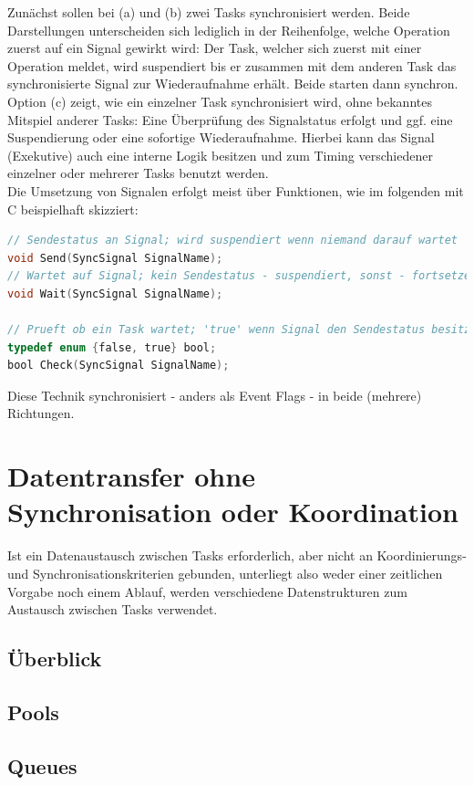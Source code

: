 \documentclass{llncs}
\begin{document}
Zunächst sollen bei (a) und (b) zwei Tasks synchronisiert werden. Beide Darstellungen unterscheiden sich lediglich in der Reihenfolge, welche Operation zuerst auf ein Signal gewirkt wird: Der Task, welcher sich zuerst mit einer Operation meldet, wird suspendiert bis er zusammen mit dem anderen Task das synchronisierte Signal zur Wiederaufnahme erhält. Beide starten dann synchron.
Option (c) zeigt, wie ein einzelner Task synchronisiert wird, ohne bekanntes Mitspiel anderer Tasks: Eine Überprüfung des Signalstatus erfolgt und ggf. eine Suspendierung oder eine sofortige Wiederaufnahme. Hierbei kann das Signal (Exekutive) auch eine interne Logik besitzen und zum Timing verschiedener einzelner oder mehrerer Tasks benutzt werden.\\

Die Umsetzung von Signalen erfolgt meist über Funktionen, wie im folgenden mit C beispielhaft skizziert:
\begin{lstlisting}[language=C]
// Sendestatus an Signal; wird suspendiert wenn niemand darauf wartet
void Send(SyncSignal SignalName);
// Wartet auf Signal; kein Sendestatus - suspendiert, sonst - fortsetzen
void Wait(SyncSignal SignalName);

// Prueft ob ein Task wartet; 'true' wenn Signal den Sendestatus besitzt
typedef enum {false, true} bool;
bool Check(SyncSignal SignalName);
\end{lstlisting}
Diese Technik synchronisiert - anders als Event Flags - in beide (mehrere) Richtungen.

\section{Datentransfer ohne Synchronisation oder Koordination}
Ist ein Datenaustausch zwischen Tasks erforderlich, aber nicht an Koordinierungs- und Synchronisationskriterien gebunden, unterliegt also weder einer zeitlichen Vorgabe noch einem Ablauf, werden verschiedene Datenstrukturen zum Austausch zwischen Tasks verwendet.  
\subsection{Überblick}
\subsection{Pools}
\subsection{Queues}
\end{document}
